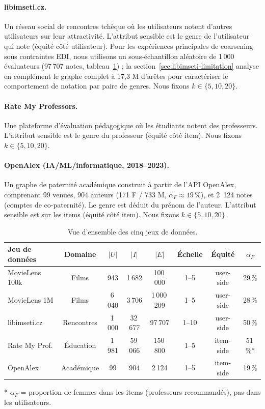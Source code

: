 \documentclass[12pt]{report}
\begin{document}
\paragraph{libimseti.cz.}
Un réseau social de rencontres tchèque où les utilisateurs notent
d'autres utilisateurs sur leur attractivité. L'attribut sensible est le
genre de l'utilisateur qui note (équité côté utilisateur). Pour les
expériences principales de coarsening sous contraintes EDI, nous
utilisons un sous-échantillon aléatoire de 1\,000 évaluateurs (97\,707
notes, tableau~\ref{tab:datasets-overview}) ; la
section~\ref{sec:libimseti-limitation} analyse en complément le graphe
complet à 17,3 M d'arêtes pour caractériser le comportement de notation
par paire de genres. Nous fixons $k \in \{5, 10, 20\}$.

\paragraph{Rate My Professors.}
Une plateforme d'évaluation pédagogique où les étudiants notent des
professeurs. L'attribut sensible est le genre du professeur (équité côté
item). Nous fixons $k \in \{5, 10, 20\}$.

\paragraph{OpenAlex (IA/ML/informatique, 2018--2023).}
Un graphe de paternité académique construit à partir de l'API OpenAlex,
comprenant 99 venues, 904 auteurs (171 F / 733 M, $\alpha_F \approx
19\,\%$), et 2~124 notes (comptes de co-paternité). Le genre est déduit
du prénom de l'auteur. L'attribut sensible est sur les items (équité côté
item). Nous fixons $k \in \{5, 10, 20\}$.

\begin{table}[H]
\centering
\caption{Vue d'ensemble des cinq jeux de données.}
\label{tab:datasets-overview}
\begin{tabular}{lccccccc}
\hline
Jeu de données & Domaine & $|U|$ & $|I|$ & $|E|$ & Échelle & Équité & $\alpha_F$ \\
\hline
MovieLens 100k    & Films        & 943    & 1\,682  & 100\,000    & 1--5  & user-side & 29\,\% \\
MovieLens 1M      & Films        & 6\,040 & 3\,706  & 1\,000\,209 & 1--5  & user-side & 28\,\% \\
libimseti.cz      & Rencontres   & 1\,000 & 32\,677 & 97\,707     & 1--10 & user-side & 50\,\% \\
Rate My Prof.     & Éducation    & 1\,981 & 59\,066 & 150\,800    & 1--5  & item-side & 51\,\%* \\
OpenAlex          & Académique   & 99     & 904     & 2\,124      & 1--5  & item-side & 19\,\% \\
\hline
\end{tabular}
\vspace{2pt}
\begin{footnotesize}
* $\alpha_F$ = proportion de femmes dans les items (professeurs
recommandés), pas dans les utilisateurs.
\end{footnotesize}
\end{table}
\end{document}
